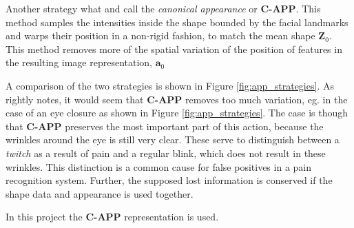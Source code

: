 \documentclass[Main]{subfiles}
\begin{document}
			\newpage
			Another strategy what \cite{Lucey2011} and \cite{Ashraf2009} call the \emph{canonical appearance} or \textbf{C-APP}.
			This method samples the intensities inside the shape bounded by the facial landmarks and warps their position in a non-rigid fashion, to match the mean shape $\textbf{Z}_0$.
			This method removes more of the spatial variation of the position of features in the resulting image representation, $\textbf{a}_0$

			A comparison of the two strategies is shown in Figure \ref{fig:app_strategies}.
			As \cite{Ashraf2009} rightly notes, it would seem that \textbf{C-APP} removes too much variation, eg. in the case of an eye closure as shown in Figure \ref{fig:app_strategies}.
			The case is though that \textbf{C-APP} preserves the most important part of this action, because the wrinkles around the eye is still very clear.
			These serve to distinguish between a \emph{twitch} as a result of pain and a regular blink, which does not result in these wrinkles.
			This distinction is a common cause for false positives in a pain recognition system.
			Further, the supposed lost information is conserved if the shape data and appearance is used together.

			In this project the \textbf{C-APP} representation is used.
\end{document}
